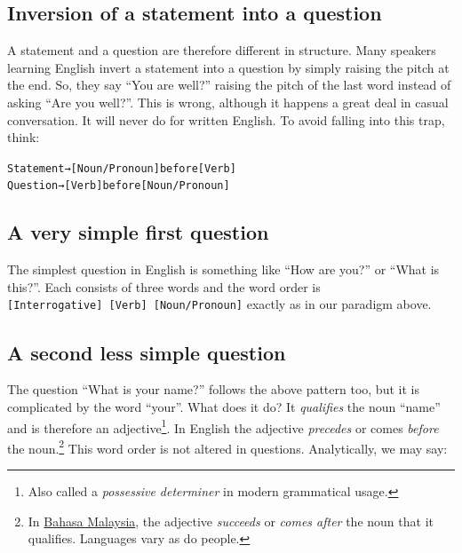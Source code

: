 \documentclass[
  a4paper,
]{article}
\newcommand\noun[1]{\textcolor{noun}{#1}}
\newcommand\pronoun[1]{\textcolor{pronoun}{#1}}
\newcommand\action[1]{\textcolor{action}{#1}}
\begin{document}
\hypertarget{inversion-of-a-statement-into-a-question}{%
\subsection{Inversion of a statement into a
question}\label{inversion-of-a-statement-into-a-question}}

A statement and a question are therefore different in structure. Many
speakers learning English invert a statement into a question by simply
raising the pitch at the end. So, they say ``You are well?'' raising the
pitch of the last word instead of asking ``Are you well?''. This is
wrong, although it happens a great deal in casual conversation. It will
never do for written English. To avoid falling into this trap, think:

\begin{tcolorbox}
\begin{alltt}
\color{normal}
Statement → [\noun{Noun}/\pronoun{Pronoun}] before [\action{Verb}]
Question  → [\action{Verb}] before [\noun{Noun}/\pronoun{Pronoun}]
\end{alltt}
\end{tcolorbox}

\hypertarget{a-very-simple-first-question}{%
\subsection{A very simple first
question}\label{a-very-simple-first-question}}

The simplest question in English is something like ``How are you?'' or
``What is this?''. Each consists of three words and the word order is
\texttt{{[}Interrogative{]}\ {[}Verb{]}\ {[}Noun/Pronoun{]}} exactly as
in our paradigm above.

\hypertarget{a-second-less-simple-question}{%
\subsection{A second less simple
question}\label{a-second-less-simple-question}}

The question ``What is your name?'' follows the above pattern too, but
it is complicated by the word ``your''. What does it do? It
\emph{qualifies} the noun ``name'' and is therefore an
adjective\footnote{Also called a \emph{possessive determiner} in modern
  grammatical usage.}. In English the adjective \emph{precedes} or comes
\emph{before} the noun.\footnote{In
  \href{http://en.wikipedia.org/wiki/Bahasa_Malaysia}{Bahasa Malaysia},
  the adjective \emph{succeeds} or \emph{comes after} the noun that it
  qualifies. Languages vary as do people.} This word order is not
altered in questions. Analytically, we may say:
\end{document}
